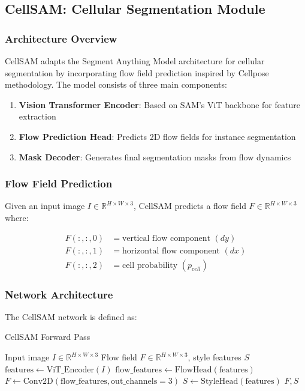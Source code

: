 \documentclass[12pt]{article}
\begin{document}
\subsection{CellSAM: Cellular Segmentation Module}

\subsubsection{Architecture Overview}

CellSAM adapts the Segment Anything Model architecture for cellular segmentation by incorporating flow field prediction inspired by Cellpose methodology. The model consists of three main components:

\begin{enumerate}
  \item \textbf{Vision Transformer Encoder}: Based on SAM's ViT backbone for feature extraction
  \item \textbf{Flow Prediction Head}: Predicts 2D flow fields for instance segmentation
  \item \textbf{Mask Decoder}: Generates final segmentation masks from flow dynamics
\end{enumerate}

\subsubsection{Flow Field Prediction}


Given an input image $I \in \mathbb{R}^{H \times W \times 3}$, CellSAM predicts a flow field $F \in \mathbb{R}^{H \times W \times 3}$ where:

\begin{align}
  F(:,:,0) & = \text{vertical flow component } (dy)   \\
  F(:,:,1) & = \text{horizontal flow component } (dx) \\
  F(:,:,2) & = \text{cell probability } (p_{cell})
\end{align}

\subsubsection{Network Architecture}

The CellSAM network is defined as:

\begin{algorithm}[H]
  \caption{CellSAM Forward Pass}
  \begin{algorithmic}[1]
    \REQUIRE Input image $I \in \mathbb{R}^{H \times W \times 3}$
    \ENSURE Flow field $F \in \mathbb{R}^{H \times W \times 3}$, style features $S$
    \STATE $\text{features} \leftarrow \text{ViT\_Encoder}(I)$
    \STATE $\text{flow\_features} \leftarrow \text{FlowHead}(\text{features})$
    \STATE $F \leftarrow \text{Conv2D}(\text{flow\_features}, \text{out\_channels}=3)$
    \STATE $S \leftarrow \text{StyleHead}(\text{features})$
    \RETURN $F, S$
  \end{algorithmic}
\end{algorithm}
\end{document}

